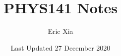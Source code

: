 \documentclass{article}
\title{PHYS141 Notes}
\author{Eric Xia}
\date{Last Updated 27 December 2020}
\begin{document}
    \maketitle
    \tableofcontents
    \pagebreak


    
    
    
    
    
    
    
    
    
    
    
    
    
    
    
    
    
    
    
    
\end{document}
